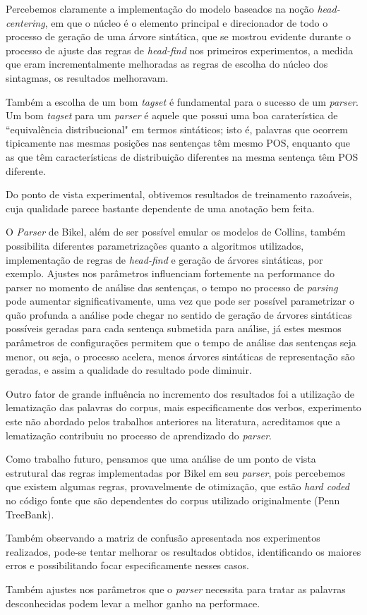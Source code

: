 Percebemos claramente a implementação do modelo baseados na noção \emph{head-centering}, em que o núcleo é o elemento principal e direcionador de todo o processo de geração de uma árvore sintática, que se mostrou evidente durante o processo de ajuste das regras de \emph{head-find} nos primeiros experimentos, a medida que eram incrementalmente melhoradas as regras de escolha do núcleo dos sintagmas, os resultados melhoravam.

Também a escolha de um bom \emph{tagset} é fundamental para o sucesso de um \emph{parser}. Um bom \emph{tagset} para um \emph{parser} é aquele que possui uma boa caraterística de ``equivalência distribucional" em termos sintáticos; isto é, palavras que ocorrem tipicamente nas mesmas posições nas sentenças têm mesmo POS, enquanto que as que têm características de distribuição diferentes na mesma sentença têm POS diferente. 

Do ponto de vista experimental, obtivemos resultados de treinamento razoáveis, cuja qualidade parece bastante dependente de uma anotação bem feita. 

O \emph{Parser} de Bikel, além de ser possível emular os modelos de Collins, também possibilita diferentes parametrizações quanto a algoritmos utilizados, implementação de regras de \emph{head-find} e geração de árvores sintáticas, por exemplo. Ajustes nos parâmetros influenciam fortemente na performance do parser no momento de análise das sentenças, o tempo no processo de \emph{parsing} pode aumentar significativamente, uma vez que pode ser possível parametrizar o quão profunda a análise pode chegar no sentido de geração de árvores sintáticas possíveis geradas para cada sentença submetida para análise, já estes mesmos parâmetros de configurações permitem que o tempo de análise das sentenças seja menor, ou seja, o processo acelera, menos árvores sintáticas de representação são geradas, e assim a qualidade do resultado pode diminuir.

Outro fator de grande influência no incremento dos resultados foi a utilização de lematização das palavras do corpus, mais especificamente dos verbos, experimento este não abordado pelos trabalhos anteriores na literatura, acreditamos que a lematização contribuiu no processo de aprendizado do \emph{parser}.

Como trabalho futuro, pensamos que uma análise de um ponto de vista estrutural das regras implementadas por Bikel em seu \emph{parser}, pois percebemos que existem algumas regras, provavelmente de otimização, que estão \emph{hard coded} no código fonte que são dependentes do corpus utilizado originalmente (Penn TreeBank). 

Também observando a matriz de confusão apresentada nos experimentos realizados, pode-se tentar melhorar os resultados obtidos, identificando os maiores erros e possibilitando focar especificamente nesses casos. 

Também ajustes nos parâmetros que o \emph{parser} necessita para tratar as palavras desconhecidas podem levar a melhor ganho na performace.

